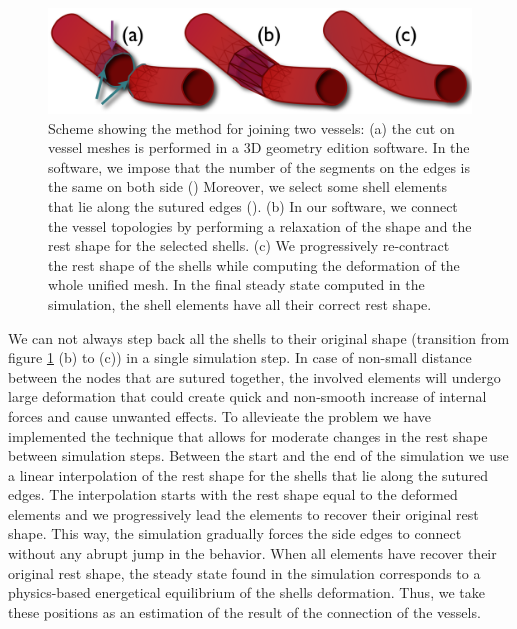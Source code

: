 \begin{figure}[tbh]
\begin{center}
\includegraphics[width=\columnwidth]{img/rest_shape_scheme.png}
\end{center}

\caption{Scheme showing the method for joining two vessels:  (a) the cut on vessel meshes is performed in a 3D geometry edition software. In the software, we impose that the number of the segments on the edges is the same on both side  (\color{BlueGreen}{$\mathbf{\rightarrow}$}\color{black})
Moreover, we select some shell elements that lie along the sutured edges (\color{purple}{$\mathbf{\rightarrow}$}\color{black}).
(b) In our software, we connect the vessel topologies by performing a relaxation of the shape and the rest shape for the selected shells.  
(c) We progressively re-contract the rest shape of the shells while computing the deformation of the whole unified mesh. 
In the final steady state computed in the simulation, the shell elements have all their correct rest shape.}
\label{fig-JoiningVessels}
\end{figure}

We can not always step back all the shells to their original shape (transition from figure \ref{fig-JoiningVessels} (b) to (c))  in a single simulation step. 
In case of non-small distance between the nodes that are sutured together, the involved elements will undergo large deformation that could create quick and non-smooth increase of internal forces and  cause unwanted effects.
To allevieate the problem we have implemented the technique that allows for moderate changes in the rest shape between simulation steps.
Between the start and the end of the simulation we use a linear interpolation of the rest shape for the shells that lie along the sutured edges. 
The interpolation starts with the rest shape equal to the deformed elements and we progressively lead the elements to recover their original rest shape.
This way, the simulation gradually forces the side edges to connect without any abrupt jump in the behavior.
When all elements have recover their original rest shape, the steady state found in the simulation corresponds to a physics-based energetical equilibrium of the shells deformation. 
Thus, we take these positions as an estimation of the result of the connection of the vessels.
